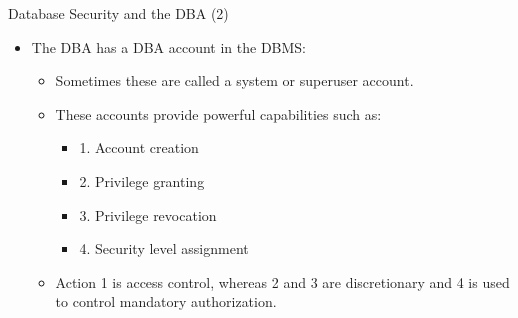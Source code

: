 \begin{frame}{Database Security and the DBA (2)}
    \Large
    
    \begin{itemize}
        \vspace{-1.5cm}
        
        \item The DBA has a DBA account in the DBMS:
        
        \begin{itemize}
            \large
            \setlength{\itemsep}{0.2cm}
            
            \item Sometimes these are called a system or superuser account.
            
            \item These accounts provide powerful capabilities such as:
            
            \begin{itemize}
                \normalsize
                \setlength{\itemsep}{0.1cm}
                
                \item 1. Account creation
                \item 2. Privilege granting
                \item 3. Privilege revocation
                \item 4. Security level assignment
            \end{itemize}
            
            \item Action 1 is access control, whereas 2 and 3 are discretionary and 4 is used to control mandatory authorization.
            
        \end{itemize}
        
    \end{itemize}
\end{frame}


